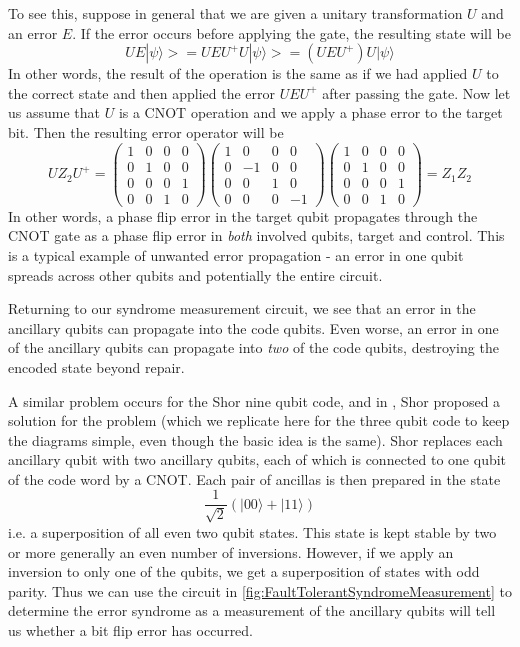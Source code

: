 \documentclass[a4paper, draft]{article}
\theoremstyle{own}
\theoremstyle{remark}
\begin{document}
To see this, suppose in general that we are given a unitary transformation $U$ and an error $E$. If the error occurs before applying the gate, the resulting state will be
$$
UE |\psi \rangle > = UEU^+ U |\psi \rangle > = (UEU^+) U |\psi \rangle
$$
In other words, the result of the operation is the same as if we had applied $U$ to the correct state and then applied the error $U E U^+$ after passing the gate. Now let us assume that $U$ is a CNOT operation and we apply a phase error to the target bit. Then the resulting error operator will be
$$
U Z_2 U^+ =
\begin{pmatrix} 1 & 0 & 0 & 0 \\ 0 & 1 & 0 & 0 \\ 0 & 0 & 0 & 1 \\ 0 & 0 & 1 & 0 \end{pmatrix} 
\begin{pmatrix} 1 & 0 & 0 & 0 \\ 0 & -1 & 0 & 0 \\ 0 & 0 & 1 & 0 \\ 0 & 0 & 0 & -1
\end{pmatrix} 
\begin{pmatrix} 1 & 0 & 0 & 0 \\ 0 & 1 & 0 & 0 \\ 0 & 0 & 0 & 1 \\ 0 & 0 & 1 & 0 \end{pmatrix} 
= Z_1 Z_2
$$
In other words, a phase flip error in the target qubit propagates through the CNOT gate as a phase flip error in \emph{both} involved qubits, target and control. This is a typical example of unwanted error propagation - an error in one qubit spreads across other qubits and potentially the entire circuit.

Returning to our syndrome measurement circuit, we see that an error in the ancillary qubits can propagate into the code qubits. Even worse, an error in one of the ancillary qubits can propagate into \emph{two} of the code qubits, destroying the encoded state beyond repair.

A similar problem occurs for the Shor nine qubit code, and in \cite{Shor96}, Shor proposed a solution for the problem (which we replicate here for the three qubit code to keep the diagrams simple, even though the basic idea is the same). Shor replaces each ancillary qubit with two ancillary qubits, each of which is connected to one qubit of the code word by a CNOT. Each pair of ancillas is then prepared in the state
$$
\frac{1}{\sqrt{2}} (|00 \rangle + |11 \rangle )
$$
i.e. a superposition of all even two qubit states. This state is kept stable by two or more generally an even number of inversions. However, if we apply an inversion to only one of the qubits, we get a superposition of states with odd parity. Thus we can use the circuit in \ref{fig:FaultTolerantSyndromeMeasurement} to determine the error syndrome as a measurement of the ancillary qubits will tell us whether a bit flip error has occurred.
\end{document}
